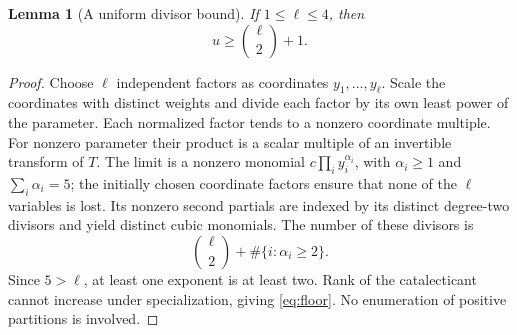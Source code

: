 \documentclass[11pt]{amsart}
\newtheorem{lemma}[theorem]{Lemma}
\theoremstyle{remark}
\numberwithin{equation}{section}
\begin{document}
\begin{lemma}[A uniform divisor bound]\label{lem:floor}
If \(1\le\ell\le4\), then
\begin{equation}\label{eq:floor}
 u\ge\binom{\ell}{2}+1.
\end{equation}
\end{lemma}
\begin{proof}
Choose \(\ell\) independent factors as coordinates \(y_1,\ldots,y_\ell\).
Scale the coordinates with distinct weights and divide each factor by
its own least power of the parameter. Each normalized factor tends to a
nonzero coordinate multiple. For nonzero parameter their product is a
scalar multiple of an invertible transform of \(T\). The limit is a
nonzero monomial \(c\prod_i y_i^{\alpha_i}\), with \(\alpha_i\ge1\) and
\(\sum_i\alpha_i=5\); the initially chosen coordinate factors ensure
that none of the \(\ell\) variables is lost. Its nonzero second
partials are indexed by its distinct degree-two divisors and yield
distinct cubic monomials. The number of these divisors is
\[
 \binom{\ell}{2}+\#\{i:\alpha_i\ge2\}.
\]
Since \(5>\ell\), at least one exponent is at least two. Rank of
the catalecticant cannot increase under specialization, giving
\eqref{eq:floor}. No enumeration of positive partitions is involved.
\end{proof}
\end{document}
